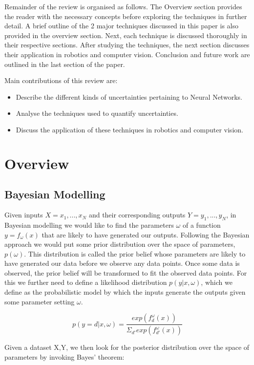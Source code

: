 \documentclass[journal]{IEEEtran}
\begin{document}
Remainder of the review is organised as follows. The Overview section provides the reader with the necessary concepts before exploring the techniques in further detail. A brief outline of the 2 major techniques discussed in this paper is also provided in the overview section. Next, each technique is discussed thoroughly in their respective sections. After studying the techniques, the next section discusses their application in robotics and computer vision. Conclusion and future work are outlined in the last section of the paper.

Main contributions of this review are:
\begin{itemize}
    \item Describe the different kinds of uncertainties pertaining to Neural Networks.
    \item Analyse the techniques used to quantify uncertainties.
    \item Discuss the application of these techniques in robotics and computer vision.
\end{itemize}
\section{Overview}
\subsection{Bayesian Modelling}
Given inputs $X = {x_1, . . . , x_N}$ and their corresponding outputs $Y = {y_1, . . . , y_N}$,
in Bayesian modelling we would like to find the parameters $\omega$ of a function $y = f_\omega(x)$ that are likely to have generated our outputs. Following the Bayesian approach we would put some prior distribution over the space of parameters, $p(\omega)$. This distribution is called the prior belief whose parameters are likely to have generated our data before we observe any data points. Once some data is observed, the prior belief will be transformed to fit the observed data points. For
this we further need to define a likelihood distribution $p(y|x,\omega)$, which we define as the probabilistic model by which the inputs generate the outputs given some parameter setting $\omega$.

\begin{equation*}
    p(y=d|x,\omega) = \frac{exp(f_{d}^{\omega}(x))}{\Sigma_{d'}exp(f_{d'}^{\omega}(x))}
\end{equation*}

Given a dataset X,Y, we then look for the posterior distribution over the space of
parameters by invoking Bayes’ theorem:
\end{document}
